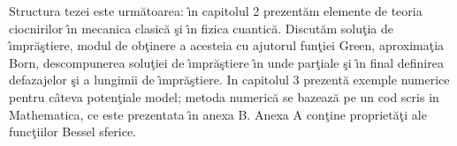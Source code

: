 

Structura tezei este urm\u atoarea: \^{\i}n capitolul 2 prezent\u am elemente de teoria ciocnirilor \^{\i}n mecanica clasic\u a \c si \^{\i}n fizica cuantic\u a. Discut\u am solu\c tia de \^{\i}mpr\u a\c stiere, modul de ob\c tinere a acesteia  cu ajutorul fun\c tiei Green, aproxima\c tia Born, descompunerea solu\c tiei  de \^{\i}mpr\u a\c stiere \^{\i}n unde par\c tiale \c si \^{\i}n final definirea defazajelor \c si a lungimii de \^{\i}mpr\u a\c stiere. In capitolul 3 prezent\u a exemple numerice pentru c\^ateva poten\c tiale model;  metoda numeric\u a se bazeaz\u a pe un cod scris in Mathematica, ce este prezentata \^{\i}n anexa B. Anexa A con\c tine propriet\u a\c ti ale func\c tiilor Bessel sferice.




